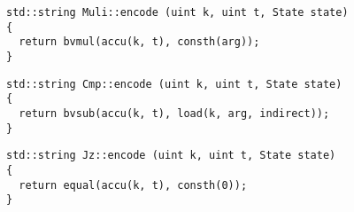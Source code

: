 
\begin{lstlisting}[style=c++, style=encode]
std::string Muli::encode (uint k, uint t, State state)
{
  return bvmul(accu(k, t), consth(arg));
}
\end{lstlisting}


\begin{lstlisting}[style=c++, style=encode]
std::string Cmp::encode (uint k, uint t, State state)
{
  return bvsub(accu(k, t), load(k, arg, indirect));
}
\end{lstlisting}




\begin{lstlisting}[style=c++, style=encode]
std::string Jz::encode (uint k, uint t, State state)
{
  return equal(accu(k, t), consth(0));
}
\end{lstlisting}

